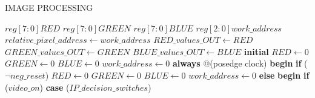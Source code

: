 \begin{algorithm}[H]
	\caption{IMAGE PROCESSING \cite{fpgaipvgarepo}}
	\begin{algorithmic}[1]
		\State $reg [7:0] RED$
		\State $reg [7:0] GREEN$
		\State $reg [7:0] BLUE$
		\State $reg [2:0] work\_address$ 
		\State
		\State $relative\_pixel\_address \gets work\_address$
		\State $RED\_values\_OUT \gets RED$
		\State $GREEN\_values\_OUT \gets GREEN$
		\State $BLUE\_values\_OUT \gets BLUE$
		\State
		\State \textbf{initial} 
		\State \hspace{\algorithmicindent}$RED \gets 0$
		\State \hspace{\algorithmicindent}$GREEN \gets 0$
		\State \hspace{\algorithmicindent}$BLUE \gets 0$
		\State \hspace{\algorithmicindent}$work\_address \gets 0$
		\State
		\State \textbf{always} @(posedge clock) 
		\State \textbf{begin}
		\State \hspace{\algorithmicindent}\textbf{if} ($\neg neg\_reset$) 
		\State \hspace{\algorithmicindent}\hspace{\algorithmicindent}
		\State \hspace{\algorithmicindent}\hspace{\algorithmicindent}$RED \gets 0$
		\State \hspace{\algorithmicindent}\hspace{\algorithmicindent}$GREEN \gets 0$
		\State \hspace{\algorithmicindent}\hspace{\algorithmicindent}$BLUE \gets 0$
		\State \hspace{\algorithmicindent}\hspace{\algorithmicindent}$work\_address \gets 0$
		\State \hspace{\algorithmicindent}\textbf{else} 
		\State \hspace{\algorithmicindent}\hspace{\algorithmicindent}\textbf{begin}
		\State \hspace{\algorithmicindent}\hspace{\algorithmicindent}\textbf{if} ($video\_on$) 
		\State \hspace{\algorithmicindent}\hspace{\algorithmicindent}\hspace{\algorithmicindent}\textbf{case} ($IP\_decision\_switches$)

\end{algorithmic}
\end{algorithm}
